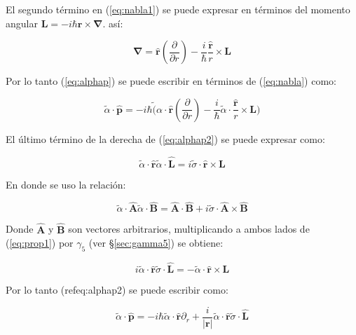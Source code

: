 \documentclass[a4paper, 12pt]{article} %
\begin{document}
El segundo t\'ermino en (\ref{eq:nabla1}) se puede expresar en t\'erminos del momento angular $\mathbf{L} = -i\hbar \mathbf{r} \times \mathbf{\nabla}$.
as\'i:

\begin{equation}\label{eq:nabla}
\mathbf{\nabla} =  \hat{\mathbf{r}}(\dfrac{\partial}{\partial r}) - \dfrac{i}{\hbar}\dfrac{\hat{\mathbf{r}}}{r} \times \mathbf{L}
\end{equation}

Por lo tanto (\ref{eq:alphap}) se puede escribir en t\'erminos de (\ref{eq:nabla}) como:

\begin{equation}\label{eq:alphap2}
\widetilde{\alpha}\cdot \mathbf{\hat{p}} = -i\hbar \widetilde({\alpha}\cdot \hat{\mathbf{r}}(\dfrac{\partial}{\partial r}) - 
\dfrac{i}{\hbar}\widetilde{\alpha}\cdot \dfrac{\hat{\mathbf{r}}}{r} \times \mathbf{L})
\end{equation}

El \'ultimo t\'ermino de la derecha de (\ref{eq:alphap2}) se puede expresar como:

\begin{equation}\label{eq:prop1}
\widetilde{\alpha}\cdot\hat{\mathbf{r}}\widetilde{\alpha} \cdot \hat{\mathbf{L}} = i\widetilde{\sigma}\cdot \hat{\mathbf{r}} \times \mathbf{L}
\end{equation}

En donde se uso la relaci\'on:

\begin{equation}
\widetilde{\alpha}\cdot \hat{\mathbf{A}}\widetilde{\alpha}\cdot \hat{\mathbf{B}}
= \hat{\mathbf{A}} \cdot \hat{\mathbf{B}} +  i\widetilde{\sigma}\cdot \hat{\mathbf{A}}\times \hat{\mathbf{B}}
\end{equation}

Donde $\hat{\mathbf{A}}$ y $\hat{\mathbf{B}}$ son vectores arbitrarios, 
multiplicando a ambos lados de (\ref{eq:prop1}) por $\gamma_5$ (ver \S \ref{sec:gamma5}) 
se obtiene:   

\begin{equation}
i\widetilde{\alpha}\cdot\hat{\mathbf{r}}\widetilde{\sigma} \cdot \hat{\mathbf{L}} = -\widetilde{\alpha}\cdot \hat{\mathbf{r}} \times \mathbf{L}
\end{equation}

Por lo tanto (ref{eq:alphap2}) se puede escribir como:

\begin{equation}\label{eq:alphap3}
\widetilde{\alpha}\cdot \mathbf{\hat{p}} = -i\hbar \widetilde{\alpha}\cdot \hat{\mathbf{r}}\partial_r + \dfrac{i}{|\mathbf{r}|}
\widetilde{\alpha}\cdot \hat{\mathbf{r}}\widetilde{\sigma}\cdot \hat{\mathbf{L}}
\end{equation} 
\end{document}
